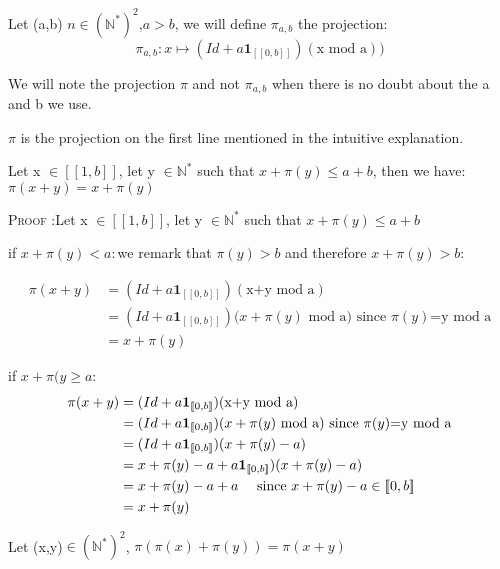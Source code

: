 \begin{definition}

Let (a,b) \(n \in (\mathbb{N}^*)^2\),\(a>b\), we will define \(\pi_{a,b}\) the projection:
\[ \pi_{a,b}:x \longmapsto (Id+a\mathbf{1}_{ [\![0,b]\!]})(\text{x mod a}))\]
\end{definition}

We will note  the projection \(\pi\) and not \(\pi_{a,b}\) when there is no doubt about the a and b we use.

\begin{remark}
\(\pi\) is the projection on the first line mentioned in the intuitive explanation.
\end{remark}

\begin{proposition}
Let x \(\in [\![1,b]\!]\), let y \(\in \mathbb{N}^*\) such that \(x+\pi(y)\leqslant a+b\), then we have: \(\pi(x+y)=x+\pi(y)\)
\end{proposition}

\textsc{Proof :}Let x \(\in [\![1,b]\!]\), let y \(\in \mathbb{N}^*\) such that \(x+\pi(y)\leqslant a+b\)

if \(x+\pi(y)< a:\)we remark that \(\pi(y)>b\) and therefore \(x+\pi(y)>b\):

\begin{align*}
 \pi(x+y) & = (Id+a\mathbf{1}_{ [\![0,b]\!]})(\text{x+y mod a})\\
& = (Id+a\mathbf{1}_{ [\![0,b]\!]})(x+\pi(y)\text{ mod a) since } \pi(y)\text{=y mod a} \\
& =x+ \pi(y)
\end{align*}

if \(x+\pi(y\geqslant a\):
\begin{align*}
 \pi(x+y) & = (Id+a\mathbf{1}_{ [\![0,b]\!]})(\text{x+y mod a})\\
& = (Id+a\mathbf{1}_{ [\![0,b]\!]})(x+\pi(y)\text{ mod a) since } \pi(y)\text{=y mod a} \\
& = (Id+a\mathbf{1}_{ [\![0,b]\!]})(x+\pi(y) - a) \\
& = x+\pi(y) - a +a\mathbf{1}_{ [\![0,b]\!]})(x+\pi(y) - a) \\
& = x+\pi(y) - a +a \text{ \quad since } x+\pi(y) - a \in [\![0,b]\!] \\
& = x+\pi(y)
\end{align*}


\begin{proposition}
Let (x,y)\(\in (\mathbb{N}^*)^2\), \(\pi(\pi(x)+\pi(y))=\pi(x+y)\)
\end{proposition}

